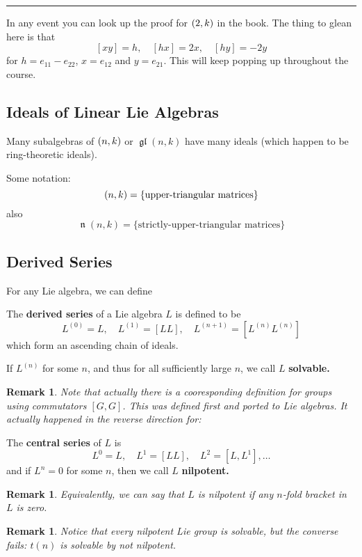 \documentclass[12pt]{article}
\theoremstyle{nonumberbreak}
\theoremstyle{changebreak}
\theoremstyle{nonumberbreak}
\theoremstyle{change}
\newtheorem{rmk}[thm]{Remark}
\newcommand*{\brk}{
\rule{2in}{.1pt}
}
\DeclareMathOperator{\gl}{\mathfrak{gl}}
\let\sl\relax
\DeclareMathOperator{\sl}{\mathfrak{sl}}
\let\t\relax
\DeclareMathOperator{\t}{\mathfrak{t}}
\DeclareMathOperator{\n}{\mathfrak{n}}
\begin{document}
\brk

In any event you can look up the proof for $\sl(2,k)$ in the book. The thing to glean here is that
\[[xy]=h,\quad [hx]=2x,\quad [hy]=-2y\]
for $h=e_{11}-e_{22}$, $x=e_{12}$ and $y=e_{21}$. This will keep popping up throughout the course.

\subsection{Ideals of Linear Lie Algebras}
Many subalgebras of $\sl(n,k)$ or $\gl(n,k)$ have many ideals (which happen to be ring-theoretic ideals).

\begin{defn}
	Some notation:
	\[\t(n,k)=\{\text{upper-triangular matrices}\}\] 
	also 
	\[\n(n,k)=\{\text{strictly-upper-triangular matrices}\}\]
\end{defn}

\subsection{Derived Series}
For any Lie algebra, we can define
\begin{defn}
	The \textbf{derived series} of a Lie algebra $L$ is defined to be
	\[L^{(0)}=L,\quad L^{(1)}=[LL],\quad L^{(n+1)}=[L^{(n)}L^{(n)}]\]
	which form an ascending chain of ideals.
\end{defn}

\begin{defn}
	If $L^{(n)}$ for some $n$, and thus for all sufficiently large $n$, we call $L$ \textbf{solvable.}
\end{defn}
\begin{rmk}
	Note that actually there is a cooresponding definition for groups using commutators $[G,G]$.
	This was defined first and ported to Lie algebras. It actually happened in the reverse direction for:
\end{rmk}

\begin{defn}
	The \textbf{central series} of $L$ is 
	\[L^0=L,\quad L^1=[LL],\quad L^2=[L,L^1],\dots\]
	and if $L^n=0$ for some $n$, then we call $L$ \textbf{nilpotent.}
\end{defn}
\begin{rmk}
	Equivalently, we can say that $L$ is nilpotent if \textit{any $n$-fold bracket} in $L$ is zero.
\end{rmk}
\begin{rmk}
	Notice that every nilpotent Lie group is solvable, but the converse fails: $t(n)$ is solvable by not nilpotent.
\end{rmk}
\end{document}
